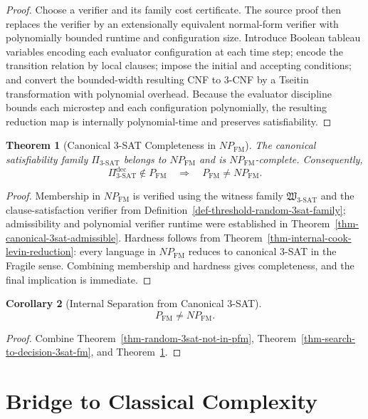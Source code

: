 \documentclass[11pt]{article}
\newtheorem{theorem}{Theorem}[section]
\newtheorem{corollary}[theorem]{Corollary}
\theoremstyle{definition}
\theoremstyle{remark}
\newcommand{\FM}{\mathrm{FM}}
\newcommand{\PFM}{P_{\mathrm{FM}}}
\newcommand{\NPFM}{NP_{\mathrm{FM}}}
\begin{document}
\begin{proof}
Choose a verifier and its family cost certificate. The source proof then replaces the verifier by an extensionally equivalent normal-form verifier with polynomially bounded runtime and configuration size. Introduce Boolean tableau variables encoding each evaluator configuration at each time step; encode the transition relation by local clauses; impose the initial and accepting conditions; and convert the bounded-width resulting CNF to $3$-CNF by a Tseitin transformation with polynomial overhead. Because the evaluator discipline bounds each microstep and each configuration polynomially, the resulting reduction map is internally polynomial-time and preserves satisfiability.
\end{proof}

\begin{theorem}[Canonical 3-SAT Completeness in $NP_{\FM}$]\label{thm-sat-membership-hardness-transfer}
The canonical satisfiability family $\Pi_{3\text{-SAT}}$ belongs to $\NPFM$ and is $NP_{\FM}$-complete. Consequently,
\[
\Pi^{\mathrm{dec}}_{3\text{-SAT}} \notin P_{\FM}
\quad\Longrightarrow\quad
\PFM \neq \NPFM.
\]
\end{theorem}

\begin{proof}
Membership in $\NPFM$ is verified using the witness family $\mathfrak W_{3\text{-SAT}}$ and the clause-satisfaction verifier from Definition~\ref{def-threshold-random-3sat-family}; admissibility and polynomial verifier runtime were established in Theorem~\ref{thm-canonical-3sat-admissible}. Hardness follows from Theorem~\ref{thm-internal-cook-levin-reduction}: every language in $\NPFM$ reduces to canonical $3$-SAT in the Fragile sense. Combining membership and hardness gives completeness, and the final implication is immediate.
\end{proof}

\begin{corollary}[Internal Separation from Canonical 3-SAT]\label{cor-pfm-neq-npfm-from-random-3sat}
\[
\PFM \neq \NPFM.
\]
\end{corollary}

\begin{proof}
Combine Theorem~\ref{thm-random-3sat-not-in-pfm}, Theorem~\ref{thm-search-to-decision-3sat-fm}, and Theorem~\ref{thm-sat-membership-hardness-transfer}.
\end{proof}

\section{Bridge to Classical Complexity}
\end{document}

